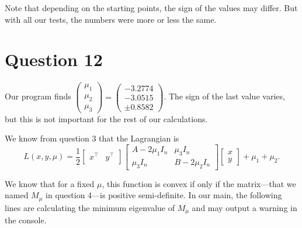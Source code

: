 \documentclass{article}
\newcommand{\tp}{^\top}
\begin{document}
Note that depending on the starting points, the sign of the values may differ. But with all our tests, the numbers were more or less the same.


\section*{Question 12}

Our program finds  
$\begin{pmatrix}
\mu_1\\
\mu_2\\
\mu_3
\end{pmatrix} =
\begin{pmatrix}
-3.2774\\
-3.0515\\
\pm 0.8582
\end{pmatrix}$. The sign of the last value varies, but this is not important for the rest of our calculations.

We know from question 3 that the Lagrangian is\\
$$ L(x, y, \mu) = \dfrac{1}{2}
\begin{bmatrix} x\tp & y\tp\end{bmatrix}
\begin{bmatrix} A-2\mu_1 I_n & \mu_3 I_n \\
\mu_3 I_n & B-2\mu_2 I_n \end{bmatrix}
\begin{bmatrix} x \\ y \end{bmatrix}
+ \mu_1 + \mu_2. $$

We know that for a fixed $\mu$, this function is convex if only if the matrix---that we named $M_\mu$ in question 4---is positive semi-definite.
In our main, the following lines are calculating the minimum eigenvalue of $M_\mu$ and may output a warning in the console.


\end{document}
